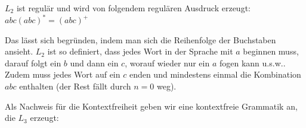 \begin{teile}
	\item
	$L_2$ ist regulär und wird von folgendem regulären Ausdruck erzeugt: $abc(abc)^* = (abc)^+$

	Das lässt sich begründen, indem man sich die Reihenfolge der Buchstaben ansieht. $L_2$ ist so definiert, dass jedes Wort in der Sprache mit $a$ beginnen muss, darauf folgt ein $b$ und dann ein $c$, worauf wieder nur ein $a$ fogen kann u.s.w.. Zudem muss jedes Wort auf ein $c$ enden und mindestens einmal die Kombination $abc$ enthalten (der Rest fällt durch $n=0$ weg).
	
	

	\vspace{0.3cm}

	\item
	Als Nachweis für die Kontextfreiheit geben wir eine kontextfreie Grammatik an, die $L_3$ erzeugt:
	

\end{teile}
